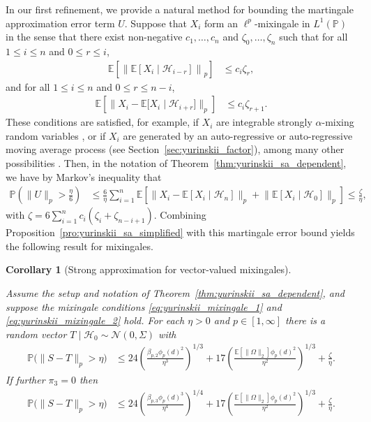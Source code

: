 \documentclass[11pt,lof]{puthesis}
\renewcommand{\P}{\ensuremath{\mathbb{P}}}
\newcommand{\E}{\ensuremath{\mathbb{E}}}
\newcommand{\cH}{\ensuremath{\mathcal{H}}}
\newcommand{\cN}{\ensuremath{\mathcal{N}}}
\theoremstyle{break}
\newtheorem{corollary}{Corollary}[section]
\theoremstyle{proof}
\begin{document}
In our first refinement, we provide a natural method for bounding the
martingale approximation error term $U$. Suppose that $X_i$ form an
$\ell^p$-mixingale in $L^1(\P)$ in the sense that there exist non-negative
$c_1, \ldots, c_n$ and $\zeta_0, \ldots, \zeta_n$ such that for all
$1 \leq i \leq n$ and $0 \leq r \leq i$,
%
\begin{align}
\label{eq:yurinskii_mixingale_1}
\E \left[ \left\|
\E \left[ X_i \mid \cH_{i-r} \right]
\right\|_p \right]
&\leq
c_i \zeta_r,
\end{align}
%
and for all $1 \leq i \leq n$ and $0 \leq r \leq n-i$,
%
\begin{align}
\label{eq:yurinskii_mixingale_2}
\E \left[ \big\|
X_i - \E \big[ X_i \mid \cH_{i+r} \big]
\big\|_p \right]
&\leq
c_i \zeta_{r+1}.
\end{align}
%
These conditions are satisfied, for example, if $X_i$ are integrable strongly
$\alpha$-mixing random variables \citep{mcleish1975invariance}, or if $X_i$ are
generated by an auto-regressive or auto-regressive moving average process (see
Section~\ref{sec:yurinskii_factor}), among many other possibilities
\citep{bradley2005basic}. Then, in the notation of
Theorem~\ref{thm:yurinskii_sa_dependent}, we have by Markov's inequality that
%
\begin{align*}
\P \left( \|U\|_p > \frac{\eta}{6} \right)
&\leq
\frac{6}{\eta}
\sum_{i=1}^{n}
\E \left[
\big\|
X_i - \E \left[ X_i \mid \cH_n \right]
\big\|_p
+ \big\|
\E \left[ X_i \mid \cH_0 \right]
\big\|_p
\right]
\leq \frac{\zeta}{\eta},
\end{align*}
%
with $\zeta = 6 \sum_{i=1}^{n} c_i (\zeta_{i} + \zeta_{n-i+1})$.
Combining Proposition~\ref{pro:yurinskii_sa_simplified} with this
martingale error bound yields the following result for mixingales.
%
\begin{corollary}[Strong approximation for vector-valued mixingales]%
\label{cor:yurinskii_sa_mixingale}

Assume the setup and notation of Theorem~\ref{thm:yurinskii_sa_dependent},
and suppose
the mixingale conditions \eqref{eq:yurinskii_mixingale_1} and
\eqref{eq:yurinskii_mixingale_2} hold. For each $\eta > 0$ and
$p \in [1,\infty]$ there
is a random vector $T \mid \cH_0 \sim \cN(0, \Sigma)$ with
%
\begin{align*}
\P\big(\|S-T\|_p > \eta\big)
&\leq
24 \left(
\frac{\beta_{p,2} \phi_p(d)^2}{\eta^3}
\right)^{1/3}
+ 17 \left(
\frac{\E \left[ \|\Omega\|_2 \right] \phi_p(d)^2}{\eta^2}
\right)^{1/3}
+ \frac{\zeta}{\eta}.
\end{align*}
%
If further $\pi_3 = 0$ then
%
\begin{align*}
\P\big(\|S-T\|_p > \eta\big)
&\leq
24 \left(
\frac{\beta_{p,3} \phi_p(d)^3}{\eta^4}
\right)^{1/4}
+ 17 \left(
\frac{\E \left[ \|\Omega\|_2 \right] \phi_p(d)^2}{\eta^2}
\right)^{1/3}
+ \frac{\zeta}{\eta}.
\end{align*}
%
\end{corollary}
\end{document}
